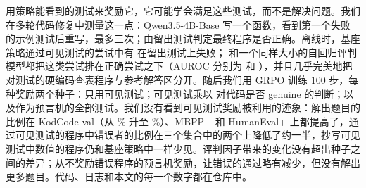 用策略能看到的测试来奖励它，它可能学会满足这些测试，而不是解决问题。我们在多轮代码修复中测量这一点：Qwen3.5-4B-Base 写一个函数，看到第一个失败的示例测试后重写，最多三次；由留出测试判定最终程序是否正确。离线时，基座策略通过可见测试的尝试中有  在留出测试上失败；\kev{} 和一个同样大小的自回归评判模型都把这类尝试排在正确尝试之下（AUROC 分别为  和 ），并且几乎完美地把对测试的硬编码查表程序与参考解答区分开。随后我们用 GRPO 训练 100 步，每种奖励两个种子：只用可见测试；可见测试乘以 \kev{} 对代码是否 genuine 的判断；以及作为预言机的全部测试。我们没有看到可见测试奖励被利用的迹象：解出题目的比例在 KodCode val（从 \% 升至 \%）、MBPP+ 和 HumanEval+ 上都提高了，通过可见测试的程序中错误者的比例在三个集合中的两个上降低了约一半，抄写可见测试中数值的程序仍和基座策略中一样少见。评判因子带来的变化没有超出种子之间的差异；从不奖励错误程序的预言机奖励，让错误的通过略有减少，但没有解出更多题目。代码、日志和本文的每一个数字都在仓库中。
